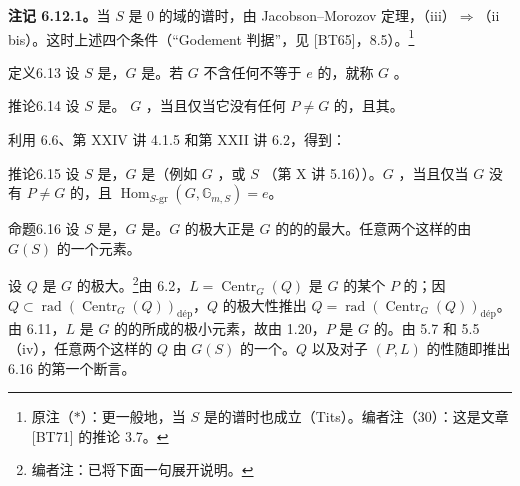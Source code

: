 \textbf{注记 6.12.1。}当 $S$ 是 $0$ 的域的谱时，由 Jacobson--Morozov 定理，（iii）$\Rightarrow$（ii bis）。这时上述四个条件（“Godement 判据”，见 [BT65]，8.5）。\footnote{原注（$*$）：更一般地，当 $S$ 是的谱时也成立（Tits）。编者注（30）：这是文章 [BT71] 的推论 3.7。}
\begin{SGAresult}{定义}{6.13}
设 $S$ 是，$G$ 是。若 $G$ 不含任何不等于 $e$ 的，就称 $G$ 。
\end{SGAresult}
\begin{SGAresult}{推论}{6.14}
设 $S$ 是。 $G$ ，当且仅当它没有任何 $P\neq G$ 的，且其。
\end{SGAresult}
利用 6.6、第 XXIV 讲 4.1.5 和第 XXII 讲 6.2，得到：
\begin{SGAresult}{推论}{6.15}
设 $S$ 是，$G$ 是（例如 $G$ ，或 $S$ （第 X 讲 5.16））。$G$ ，当且仅当 $G$ 没有 $P\neq G$ 的，且 $\operatorname{Hom}_{S\text{-gr}}(G,\mathbb G_{m,S})=e$。
\end{SGAresult}
\begin{SGAresult}{命题}{6.16}
设 $S$ 是，$G$ 是。$G$ 的极大正是 $G$ 的的的最大。任意两个这样的由 $G(S)$ 的一个元素。
\end{SGAresult}
设 $Q$ 是 $G$ 的极大。\footnote{编者注：已将下面一句展开说明。}由 6.2，$L=\operatorname{Centr}_G(Q)$ 是 $G$ 的某个 $P$ 的；因 $Q\subset\operatorname{rad}(\operatorname{Centr}_G(Q))_{\mathrm{d\text{é}p}}$，$Q$ 的极大性推出 $Q=\operatorname{rad}(\operatorname{Centr}_G(Q))_{\mathrm{d\text{é}p}}$。由 6.11，$L$ 是 $G$ 的的所成的极小元素，故由 1.20，$P$ 是 $G$ 的。由 5.7 和 5.5（iv），任意两个这样的 $Q$ 由 $G(S)$ 的一个。$Q$ 以及对子 $(P,L)$ 的性随即推出 6.16 的第一个断言。
